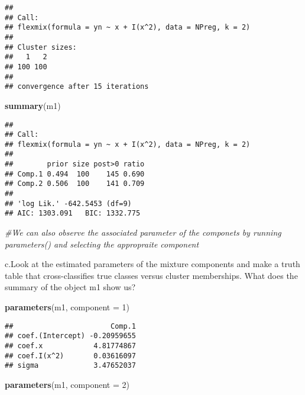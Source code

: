 \documentclass[]{article}
\newenvironment{Shaded}{\begin{snugshade}}{\end{snugshade}}
\newcommand{\CommentTok}[1]{\textcolor[rgb]{0.56,0.35,0.01}{\textit{#1}}}
\newcommand{\DataTypeTok}[1]{\textcolor[rgb]{0.13,0.29,0.53}{#1}}
\newcommand{\DecValTok}[1]{\textcolor[rgb]{0.00,0.00,0.81}{#1}}
\newcommand{\KeywordTok}[1]{\textcolor[rgb]{0.13,0.29,0.53}{\textbf{#1}}}
\newcommand{\NormalTok}[1]{#1}
\begin{document}
\begin{verbatim}
## 
## Call:
## flexmix(formula = yn ~ x + I(x^2), data = NPreg, k = 2)
## 
## Cluster sizes:
##   1   2 
## 100 100 
## 
## convergence after 15 iterations
\end{verbatim}

\begin{Shaded}
\begin{Highlighting}[]
\KeywordTok{summary}\NormalTok{(m1)}
\end{Highlighting}
\end{Shaded}

\begin{verbatim}
## 
## Call:
## flexmix(formula = yn ~ x + I(x^2), data = NPreg, k = 2)
## 
##        prior size post>0 ratio
## Comp.1 0.494  100    145 0.690
## Comp.2 0.506  100    141 0.709
## 
## 'log Lik.' -642.5453 (df=9)
## AIC: 1303.091   BIC: 1332.775
\end{verbatim}

\begin{Shaded}
\begin{Highlighting}[]
\CommentTok{#We can also observe the associated parameter of the componets by running parameters() and selecting the appropraite component}
\end{Highlighting}
\end{Shaded}

c.Look at the estimated parameters of the mixture components and make a
truth table that cross-classifies true classes versus cluster
memberships. What does the summary of the object m1 show us?

\begin{Shaded}
\begin{Highlighting}[]
\KeywordTok{parameters}\NormalTok{(m1, }\DataTypeTok{component =} \DecValTok{1}\NormalTok{)}
\end{Highlighting}
\end{Shaded}

\begin{verbatim}
##                       Comp.1
## coef.(Intercept) -0.20959655
## coef.x            4.81774867
## coef.I(x^2)       0.03616097
## sigma             3.47652037
\end{verbatim}

\begin{Shaded}
\begin{Highlighting}[]
\KeywordTok{parameters}\NormalTok{(m1, }\DataTypeTok{component =} \DecValTok{2}\NormalTok{)}
\end{Highlighting}
\end{Shaded}
\end{document}
